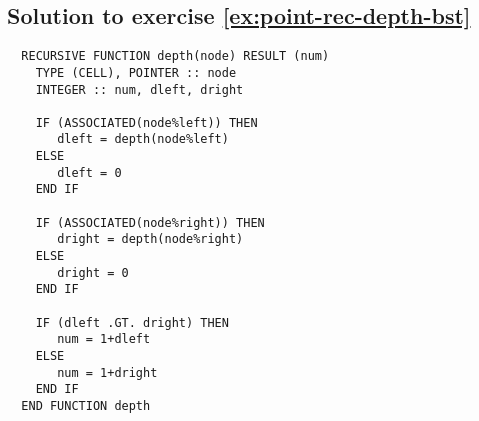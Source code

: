\subsection{Solution to exercise \ref{ex:point-rec-depth-bst}}
\begin{verbatim}
  RECURSIVE FUNCTION depth(node) RESULT (num)
    TYPE (CELL), POINTER :: node
    INTEGER :: num, dleft, dright

    IF (ASSOCIATED(node%left)) THEN
       dleft = depth(node%left)
    ELSE
       dleft = 0
    END IF

    IF (ASSOCIATED(node%right)) THEN
       dright = depth(node%right)
    ELSE
       dright = 0
    END IF

    IF (dleft .GT. dright) THEN
       num = 1+dleft
    ELSE
       num = 1+dright
    END IF
  END FUNCTION depth
\end{verbatim}


